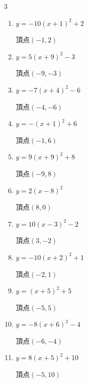 \begin{multicols}{3}
\begin{enumerate}
        $\displaystyle 頂点\left( -4 , -1 \right)$

  \item $\displaystyle y=-10\left( x+1\right)^{2}+2$

        $\displaystyle 頂点\left( -1 , 2 \right)$

  \item $\displaystyle y=5\left( x+9\right)^{2}-3$

        $\displaystyle 頂点\left( -9 , -3 \right)$

  \item $\displaystyle y=-7\left( x+4\right)^{2}-6$

        $\displaystyle 頂点\left( -4 , -6 \right)$

\columnbreak %

  \item $\displaystyle y=-\left( x+1\right)^{2}+6$

        $\displaystyle 頂点\left( -1 , 6 \right)$

  \item $\displaystyle y=9\left( x+9\right)^{2}+8$

        $\displaystyle 頂点\left( -9 , 8 \right)$

  \item $\displaystyle y=2\left( x-8\right)^{2}$

        $\displaystyle 頂点\left( 8 , 0 \right)$

  \item $\displaystyle y=10\left( x-3\right)^{2}-2$

        $\displaystyle 頂点\left( 3 , -2 \right)$

  \item $\displaystyle y=-10\left( x+2\right)^{2}+1$

        $\displaystyle 頂点\left( -2 , 1 \right)$

  \item $\displaystyle y=\left( x+5\right)^{2}+5$

        $\displaystyle 頂点\left( -5 , 5 \right)$

  \item $\displaystyle y=-8\left( x+6\right)^{2}-4$

        $\displaystyle 頂点\left( -6 , -4 \right)$

  \item $\displaystyle y=8\left( x+5\right)^{2}+10$

        $\displaystyle 頂点\left( -5 , 10 \right)$


\end{enumerate}
\end{multicols}
